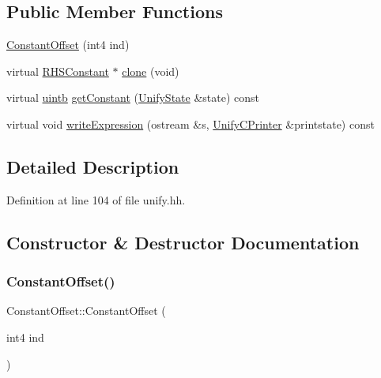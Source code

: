 \subsection*{Public Member Functions}
\begin{DoxyCompactItemize}
\item 
\mbox{\hyperlink{class_constant_offset_a2dc245509eb72dd4ee3ab7be5609e1e0}{Constant\+Offset}} (int4 ind)
\item 
virtual \mbox{\hyperlink{class_r_h_s_constant}{R\+H\+S\+Constant}} $\ast$ \mbox{\hyperlink{class_constant_offset_a0e13d942d1a2f59e329796ccae56c238}{clone}} (void)
\item 
virtual \mbox{\hyperlink{types_8h_a2db313c5d32a12b01d26ac9b3bca178f}{uintb}} \mbox{\hyperlink{class_constant_offset_a6843dd81be2edd35ce23b77f2753c8fe}{get\+Constant}} (\mbox{\hyperlink{class_unify_state}{Unify\+State}} \&state) const
\item 
virtual void \mbox{\hyperlink{class_constant_offset_ab23c0e4200af433aa78092db6488f727}{write\+Expression}} (ostream \&s, \mbox{\hyperlink{class_unify_c_printer}{Unify\+C\+Printer}} \&printstate) const
\end{DoxyCompactItemize}


\subsection{Detailed Description}


Definition at line 104 of file unify.\+hh.



\subsection{Constructor \& Destructor Documentation}
\mbox{\label{class_constant_offset_a2dc245509eb72dd4ee3ab7be5609e1e0}} 
\subsubsection{\texorpdfstring{ConstantOffset()}{ConstantOffset()}}
{\footnotesize\ttfamily Constant\+Offset\+::\+Constant\+Offset (\begin{DoxyParamCaption}\item[{int4}]{ind }\end{DoxyParamCaption})\hspace{0.3cm}{\ttfamily [inline]}}



